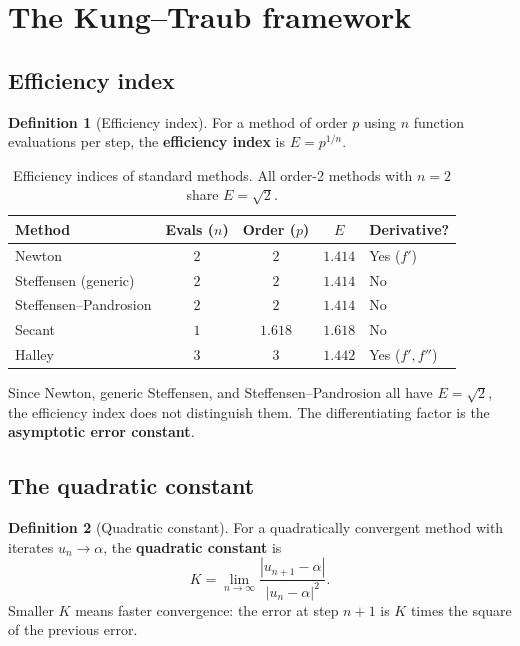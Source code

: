 \documentclass[11pt,a4paper]{article}
\theoremstyle{definition}
\newtheorem{definition}{Definition}[section]
\begin{document}
\section{The Kung--Traub framework}
\label{sec:framework}

\subsection{Efficiency index}

\begin{definition}[Efficiency index]
For a method of order $p$ using $n$ function evaluations per step, the \textbf{efficiency index} is $E = p^{1/n}$.
\end{definition}

\begin{table}[h]
\centering
\begin{tabular}{lcccl}
\toprule
\textbf{Method} & \textbf{Evals ($n$)} & \textbf{Order ($p$)} & \textbf{$E$} & \textbf{Derivative?} \\
\midrule
Newton & $2$ & $2$ & $1.414$ & Yes ($f'$) \\
Steffensen (generic) & $2$ & $2$ & $1.414$ & No \\
Steffensen--Pandrosion & $2$ & $2$ & $1.414$ & No \\
Secant & $1$ & $1.618$ & $1.618$ & No \\
Halley & $3$ & $3$ & $1.442$ & Yes ($f', f''$) \\
\bottomrule
\end{tabular}
\caption{Efficiency indices of standard methods.  All order-2 methods with $n=2$ share $E = \sqrt{2}$.}
\label{tab:efficiency}
\end{table}

Since Newton, generic Steffensen, and Steffensen--Pandrosion all have $E = \sqrt{2}$, the efficiency index does not distinguish them.  The differentiating factor is the \textbf{asymptotic error constant}.

\subsection{The quadratic constant}

\begin{definition}[Quadratic constant]
\label{def:quadratic_constant}
For a quadratically convergent method with iterates $u_n \to \alpha$, the \textbf{quadratic constant} is
\[
  K = \lim_{n \to \infty} \frac{|u_{n+1} - \alpha|}{|u_n - \alpha|^2}.
\]
Smaller $K$ means faster convergence: the error at step $n+1$ is $K$ times the square of the previous error.
\end{definition}
\end{document}
